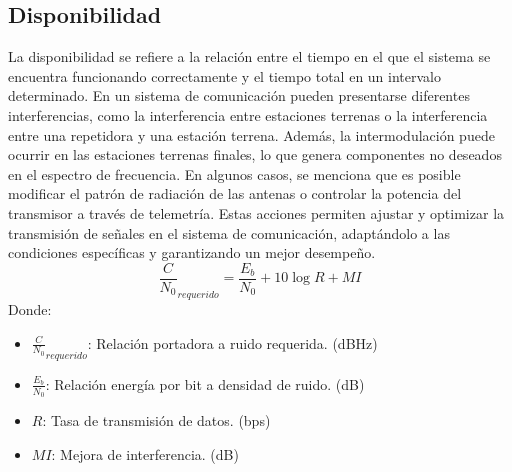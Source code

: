 \documentclass[
	12pt, %
	fleqn, %
	a4paper, %
	oneside, %
]{LegrandOrangeBook}
\begin{document}
\subsection{Disponibilidad}
La disponibilidad se refiere a la relación entre el tiempo en el que el sistema se encuentra funcionando correctamente y el tiempo total en un intervalo determinado. En un sistema de comunicación pueden presentarse diferentes interferencias, como la interferencia entre estaciones terrenas o la interferencia entre una repetidora y una estación terrena. Además, la intermodulación puede ocurrir en las estaciones terrenas finales, lo que genera componentes no deseados en el espectro de frecuencia. En algunos casos, se menciona que es posible modificar el patrón de radiación de las antenas o controlar la potencia del transmisor a través de telemetría. Estas acciones permiten ajustar y optimizar la transmisión de señales en el sistema de comunicación, adaptándolo a las condiciones específicas y garantizando un mejor desempeño.
\begin{equation}
\frac{C}{N_0}_{requerido}=\frac{E_b}{N_0}+10\log R+MI
\end{equation}
Donde:
\begin{itemize}
  \item $\frac{C}{N_0}_{requerido}$: Relación portadora a ruido requerida. (dBHz)
  \item $\frac{E_b}{N_0}$: Relación energía por bit a densidad de ruido. (dB)
  \item $R$: Tasa de transmisión de datos. (bps)
  \item $MI$: Mejora de interferencia. (dB)
\end{itemize}
\end{document}
